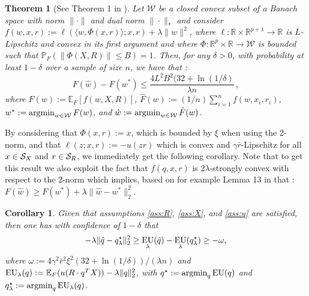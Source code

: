\documentclass[]{interact}
\theoremstyle{plain}%
\newtheorem{corollary}[theorem]{Corollary}
\theoremstyle{definition}
\theoremstyle{remark}
\def\Expect{{\mathbb E}}
\def\Prob{{\mathbb P}}
\def\argmin{\mathop{\rm argmin}}
\newcommand{\0}{\V{0}}
\newcommand{\1}{\V{1}}
\renewcommand{\Re}{\mathbb{R}}
\def\EU{\mathop{\rm EU}}
\theoremstyle{plain}
\newtheorem{thm}{Theorem}
\theoremstyle{definition}
\begin{document}
\begin{thm}[See Theorem 1 in \cite{sridharan2009fast}]\label{thm:sridharan}
Let $\mathcal{W}$ be a closed convex subset of a Banach space with norm $\|\cdot\|$ and dual norm $\|\cdot\|_*$ and consider $f(w,x,r):= \ell(\langle w, \Phi(x,r)\rangle;x,r) +\lambda\|w\|^2$, where $\ell:\Re\times\Re^{p+1}\rightarrow\Re$ is $L$-Lipschitz and convex in its first argument and where $\Phi:\Re^{p}\times\Re\rightarrow \mathcal{W}$ is bounded such that $\Prob_F(\|\Phi(X,R)\|\leq B)=1$. Then, for any $\delta>0$, with probability at least $1-\delta$ over a sample of size $n$, we have that :
\[F(\hat{w})-F(w^*)\leq \frac{4 L^2 B^2(32+\ln(1/\delta)}{\lambda n}\,,\]
where $F(w):=\Expect_F[f(w,X,R)]$, $\hat{F}(w):=(1/n)\sum_{i=1}^n f(w,x_i,r_i)$, $w^* := \argmin_{w\in\mathcal{W}}  F(w)$, and $\hat{w}:= \argmin_{w\in\mathcal{W}} \hat{F}(w)$.
\end{thm}

By considering that $\Phi(x,r):=x$, which is bounded by $\xi$ when using the 2-norm, and that $\ell(z;x,r):=-u(zr)$ which is convex and $\gamma \bar{r}$-Lipschitz for all $x\in{\mathcal{S}_X}$ and $r\in{\mathcal{S}_R}$, we immediately get the following corollary. Note that to get this result we also exploit the fact that $f(q,x,r)$ is $2\lambda$-strongly convex with respect to the 2-norm which implies, based on for example Lemma 13 in \cite{ShalevThesis} that : $F(\hat{w})\geq F(w^*)+\lambda\|\hat{w}-w^*\|_2^2$.
 
\begin{corollary}\label{thm:shai}
  Given that assumptions \ref{ass:R}, \ref{ass:X}, and \ref{ass:u} are satisfied, then one has with confidence of
  $1-\delta$ that
  \[
    -\lambda\|\hat q - q^\star_\lambda\|_2^2 \geq \EU_\lambda(\hat q) - \EU_\lambda(q^\star_\lambda) \geq -\omega,
  \]
  where $\omega := 4\gamma^2\bar{r}^2 \xi^2(32+\ln(1/\delta))/(\lambda n)$ and  $\EU_\lambda(q) := \Expect_F(u(R\cdot q^T X)) - \lambda\|q\|_2^2$,
with $q^\star := \argmin_q \EU(q)$ and $q^\star_\lambda := \argmin_q \EU_\lambda(q)$.
\end{corollary}
\end{document}
